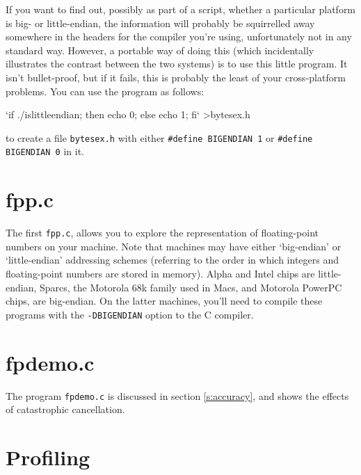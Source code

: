 \documentclass[11pt,oneside,chapters]{starlink}
\begin{document}
If you want to find out, possibly as part of a script,
whether a particular platform is big- or little-endian,
the information will probably be squirrelled away
somewhere in the headers for the compiler you're using,
unfortunately not in any standard way.  However, a
portable way of doing this (which incidentally illustrates
the contrast between the two systems) is to use this
little program.  It isn't bullet-proof, but if it fails,
this is probably the least of your cross-platform
problems.  You can use the program as follows:

\begin{terminalv}
    `if ./islittleendian; then echo 0; else echo 1; fi` >bytesex.h
\end{terminalv}

to create a file \texttt{bytesex.h} with either \texttt{\#define BIGENDIAN 1}
or \texttt{\#define BIGENDIAN 0} in it.



\section{fpp.c}
\label{a:fpp:c}


The first \texttt{fpp.c}, allows you to explore the representation of
floating-point numbers on your machine.  Note that machines may have
either `big-endian' or `little-endian' addressing schemes (referring
to the order in which integers and floating-point numbers are stored
in memory).  Alpha and Intel chips are little-endian, Sparcs, the
Motorola 68k family used in Macs, and Motorola PowerPC chips, are
big-endian.  On the latter machines, you'll need to compile these
programs with the \texttt{-DBIGENDIAN} option to the C compiler.



\section{fpdemo.c}
\label{a:fpdemo:c}

The program \texttt{fpdemo.c} is discussed in
section \ref{s:accuracy}, and shows the effects of catastrophic
cancellation.



\section{Profiling}
\label{a:profiling}
\end{document}

